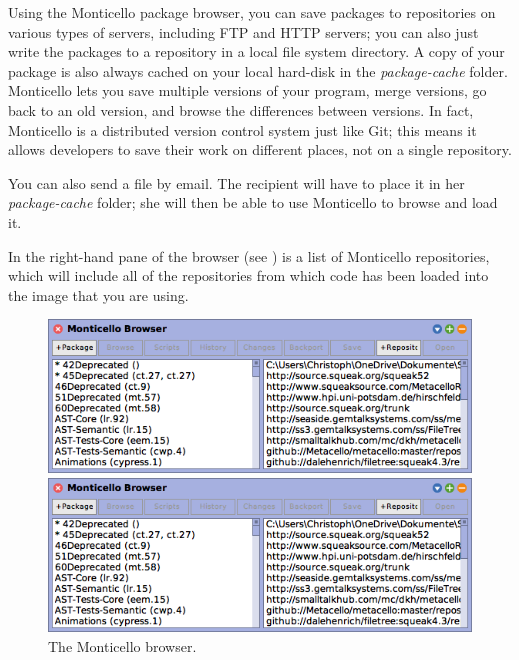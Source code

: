 \documentclass[a4paper,10pt,twoside]{book}
\begin{document}
Using the Monticello package browser, you can save packages to repositories on various types of servers, including FTP and HTTP servers; you can also just write the packages to a repository in a local file system directory.
A copy of your package is also always cached on your local hard-disk in the \emph{package-cache} folder. 
Monticello lets you save multiple versions of your program, merge versions, go back to an old version, and browse the differences between versions. 
In fact, Monticello is a distributed version control system just like Git; this means it allows developers to save their work on different places, not on a single repository.

You can also send a  file by email. 
The recipient will have to place it in her \emph{package-cache} folder; she will then be able to use Monticello to browse and load it.

In the right-hand pane of the browser (see ) is a list of Monticello repositories, which will include all of the repositories from which code has been loaded into the image that you are using.  

\begin{figure}[hbt]
\ifluluelse
	{\centerline {\includegraphics[width=\textwidth]{MonticelloBrowser}}}
	{\centerline {\includegraphics[scale=0.7]{MonticelloBrowser}}}
\caption{The Monticello browser.
\label{fig:monticello1}}
\end{figure}
\end{document}
